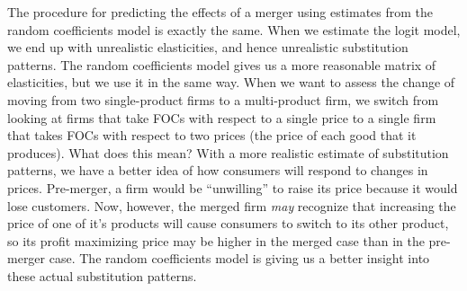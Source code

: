 \documentclass[dvipsnames]{article}
\begin{document}
The procedure for predicting the effects of a merger using estimates from the random coefficients model is exactly the same. When we estimate the logit model, we end up with unrealistic elasticities, and hence unrealistic substitution patterns. The random coefficients model gives us a more reasonable matrix of elasticities, but we use it in the same way. When we want to assess the change of moving from two single-product firms to a multi-product firm, we switch from looking at firms that take FOCs with respect to a single price to a single firm that takes FOCs with respect to two prices (the price of each good that it produces). What does this mean? With a more realistic estimate of substitution patterns, we have a better idea of how consumers will respond to changes in prices. Pre-merger, a firm would be ``unwilling'' to raise its price because it would lose customers. Now, however, the merged firm \emph{may} recognize that increasing the price of one of it's products will cause consumers to switch to its other product, so its profit maximizing price may be higher in the merged case than in the pre-merger case. The random coefficients model is giving us a better insight into these actual substitution patterns.
\end{document}
